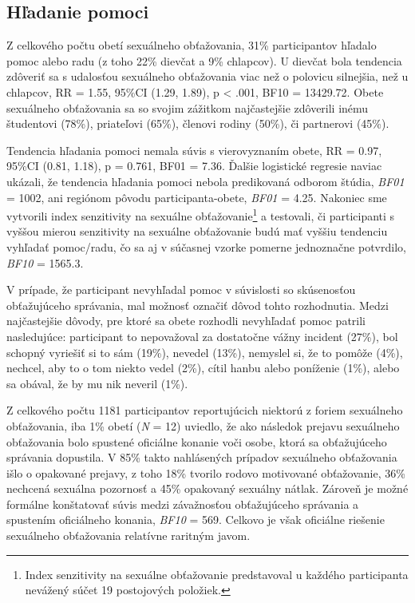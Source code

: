 \documentclass[
]{article}
\begin{document}
\hypertarget{hux13eadanie-pomoci}{%
\subsection{Hľadanie pomoci}\label{hux13eadanie-pomoci}}

Z celkového počtu obetí sexuálneho obťažovania, 31\% participantov hľadalo pomoc alebo radu (z toho 22\% dievčat a 9\% chlapcov). U dievčat bola tendencia zdôveriť sa s udalosťou sexuálneho obťažovania viac než o polovicu silnejšia, než u chlapcov, RR = 1.55, 95\%CI (1.29, 1.89), p \textless{} .001, BF10 = 13429.72. Obete sexuálneho obťažovania sa so svojim zážitkom najčastejšie zdôverili inému študentovi (78\%), priateľovi (65\%), členovi rodiny (50\%), či partnerovi (45\%).

Tendencia hľadania pomoci nemala súvis s vierovyznaním obete, RR = 0.97, 95\%CI (0.81, 1.18), p = 0.761, BF01 = 7.36. Ďalšie logistické regresie naviac ukázali, že tendencia hľadania pomoci nebola predikovaná odborom štúdia, \emph{BF01} = 1002, ani regiónom pôvodu participanta-obete, \emph{BF01} = 4.25. Nakoniec sme vytvorili index senzitivity na sexuálne obťažovanie\footnote{Index senzitivity na sexuálne obťažovanie predstavoval u každého participanta nevážený súčet 19 postojových položiek.} a testovali, či participanti s vyššou mierou senzitivity na sexuálne obťažovanie budú mať vyššiu tendenciu vyhľadať pomoc/radu, čo sa aj v súčasnej vzorke pomerne jednoznačne potvrdilo, \emph{BF10} = 1565.3.

V prípade, že participant nevyhľadal pomoc v súvislosti so skúsenosťou obťažujúceho správania, mal možnosť označiť dôvod tohto rozhodnutia. Medzi najčastejšie dôvody, pre ktoré sa obete rozhodli nevyhľadať pomoc patrili nasledujúce: participant to nepovažoval za dostatočne vážny incident (27\%), bol schopný vyriešiť si to sám (19\%), nevedel (13\%), nemyslel si, že to pomôže (4\%), nechcel, aby to o tom niekto vedel (2\%), cítil hanbu alebo poníženie (1\%), alebo sa obával, že by mu nik neveril (1\%).

Z celkového počtu 1181 participantov reportujúcich niektorú z foriem sexuálneho obťažovania, iba 1\% obetí (\emph{N} = 12) uviedlo, že ako následok prejavu sexuálneho obťažovania bolo spustené oficiálne konanie voči osobe, ktorá sa obťažujúceho správania dopustila. V 85\% takto nahlásených prípadov sexuálneho obťažovania išlo o opakované prejavy, z toho 18\% tvorilo rodovo motivované obťažovanie, 36\% nechcená sexuálna pozornosť a 45\% opakovaný sexuálny nátlak. Zároveň je možné formálne konštatovať súvis medzi závažnosťou obťažujúceho správania a spustením oficiálneho konania, \emph{BF10} = 569. Celkovo je však oficiálne riešenie sexuálneho obťažovania relatívne raritným javom.
\end{document}
